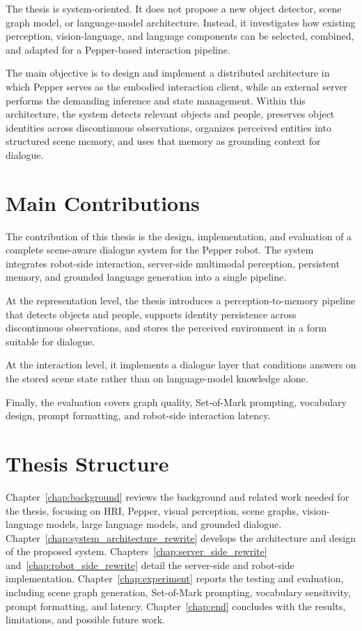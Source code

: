 The thesis is system-oriented. It does not propose a new object detector, scene graph model, or language-model architecture. Instead, it investigates how existing perception, vision-language, and language components can be selected, combined, and adapted for a Pepper-based interaction pipeline.

The main objective is to design and implement a distributed architecture in which Pepper serves as the embodied interaction client, while an external server performs the demanding inference and state management. Within this architecture, the system detects relevant objects and people, preserves object identities across discontinuous observations, organizes perceived entities into structured scene memory, and uses that memory as grounding context for dialogue.

\section{Main Contributions}

The contribution of this thesis is the design, implementation, and evaluation of a complete scene-aware dialogue system for the Pepper robot. The system integrates robot-side interaction, server-side multimodal perception, persistent memory, and grounded language generation into a single pipeline.

At the representation level, the thesis introduces a perception-to-memory pipeline that detects objects and people, supports identity persistence across discontinuous observations, and stores the perceived environment in a form suitable for dialogue.


At the interaction level, it implements a dialogue layer that conditions answers on the stored scene state rather than on language-model knowledge alone.


Finally, the evaluation covers graph quality, Set-of-Mark prompting, vocabulary design, prompt formatting, and robot-side interaction latency.

\section{Thesis Structure}

Chapter~\ref{chap:background} reviews the background and related work needed for the thesis, focusing on HRI, Pepper, visual perception, scene graphs, vision-language models, large language models, and grounded dialogue. Chapter~\ref{chap:system_architecture_rewrite} develops the architecture and design of the proposed system. Chapters~\ref{chap:server_side_rewrite} and~\ref{chap:robot_side_rewrite} detail the server-side and robot-side implementation. Chapter~\ref{chap:experiment} reports the testing and evaluation, including scene graph generation, Set-of-Mark prompting, vocabulary sensitivity, prompt formatting, and latency. Chapter~\ref{chap:end} concludes with the results, limitations, and possible future work.
